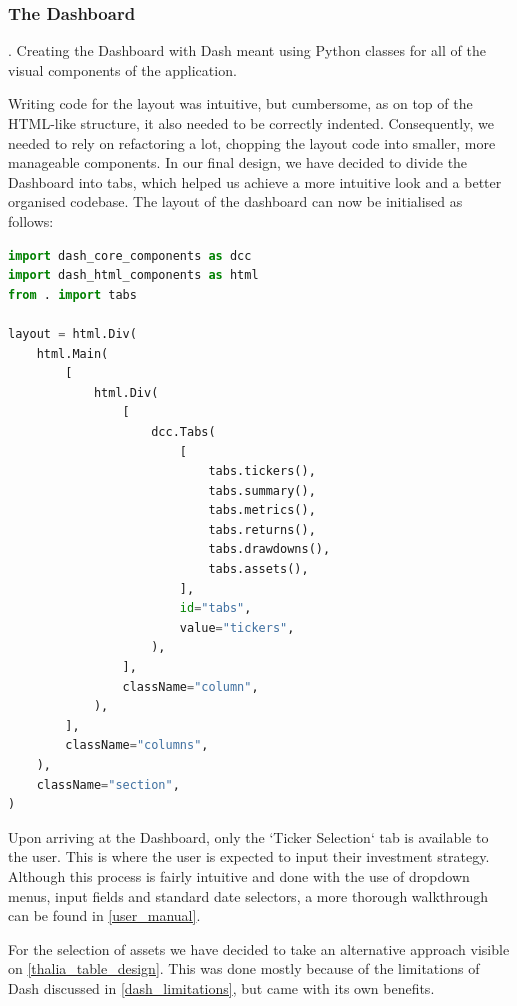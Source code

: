 \documentclass[main.tex]{subfiles}
\begin{document}
\subsubsection{The Dashboard}

 \cite{dash_layout}. Creating the Dashboard with Dash meant using Python classes for all of the visual components of the application.

Writing code for the layout was intuitive, but cumbersome, as on top of the HTML-like structure, it also needed to be correctly indented. Consequently, we needed to rely on refactoring a lot, chopping the layout code into smaller, more manageable components. In our final design, we have decided to divide the Dashboard into tabs, which helped us achieve a more intuitive look and a better organised codebase. The layout of the dashboard can now be initialised as follows:

\begin{lstlisting}[language=Python, caption=layout.py - Example of Dash Code, label=lst:dash_code]
import dash_core_components as dcc
import dash_html_components as html
from . import tabs

layout = html.Div(
    html.Main(
        [
            html.Div(
                [
                    dcc.Tabs(
                        [
                            tabs.tickers(),
                            tabs.summary(),
                            tabs.metrics(),
                            tabs.returns(),
                            tabs.drawdowns(),
                            tabs.assets(),
                        ],
                        id="tabs",
                        value="tickers",
                    ),
                ],
                className="column",
            ),
        ],
        className="columns",
    ),
    className="section",
)
\end{lstlisting}

Upon arriving at the Dashboard, only the `Ticker Selection` tab is available to the user. This is where the user is expected to input their investment strategy. Although this process is fairly intuitive and done with the use of dropdown menus, input fields and standard date selectors, a more thorough walkthrough can be found in \ref{user_manual}. 

For the selection of assets we have decided to take an alternative approach visible on \figurename{\ref{thalia_table_design}}. This was done mostly because of the limitations of Dash discussed in \ref{dash_limitations}, but came with its own benefits.
\end{document}
